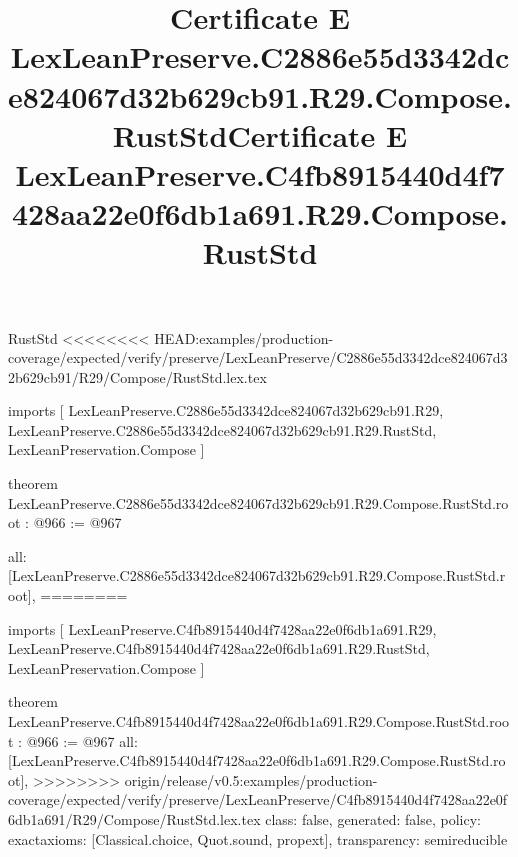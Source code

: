 \begin{lexlean}{RustStd}
<<<<<<<< HEAD:examples/production-coverage/expected/verify/preserve/LexLeanPreserve/C2886e55d3342dce824067d32b629cb91/R29/Compose/RustStd.lex.tex
\title{Certificate E LexLeanPreserve.C2886e55d3342dce824067d32b629cb91.R29.Compose.RustStd}
\begin{coremodule}
imports [
  LexLeanPreserve.C2886e55d3342dce824067d32b629cb91.R29,
  LexLeanPreserve.C2886e55d3342dce824067d32b629cb91.R29.RustStd,
  LexLeanPreservation.Compose
]

theorem LexLeanPreserve.C2886e55d3342dce824067d32b629cb91.R29.Compose.RustStd.root : @966 := @967 {
  all: [LexLeanPreserve.C2886e55d3342dce824067d32b629cb91.R29.Compose.RustStd.root],
========
\title{Certificate E LexLeanPreserve.C4fb8915440d4f7428aa22e0f6db1a691.R29.Compose.RustStd}
\begin{coremodule}
imports [
  LexLeanPreserve.C4fb8915440d4f7428aa22e0f6db1a691.R29,
  LexLeanPreserve.C4fb8915440d4f7428aa22e0f6db1a691.R29.RustStd,
  LexLeanPreservation.Compose
]

theorem LexLeanPreserve.C4fb8915440d4f7428aa22e0f6db1a691.R29.Compose.RustStd.root : @966 := @967 {
  all: [LexLeanPreserve.C4fb8915440d4f7428aa22e0f6db1a691.R29.Compose.RustStd.root],
>>>>>>>> origin/release/v0.5:examples/production-coverage/expected/verify/preserve/LexLeanPreserve/C4fb8915440d4f7428aa22e0f6db1a691/R29/Compose/RustStd.lex.tex
  class: false,
  generated: false,
  policy: exact{axioms: [Classical.choice, Quot.sound, propext]},
  transparency: semireducible
}


\end{coremodule}}
\end{coremodule}
\end{lexlean}
